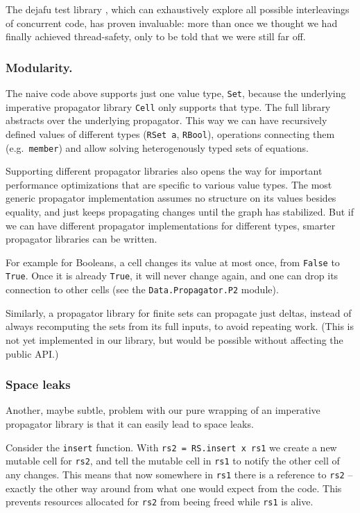 \documentclass[manuscript,anonymous,screen,acmsmall]{acmart}
\begin{document}
The dejafu test library \citep{dejafu}, which can exhaustively explore all possible interleavings of concurrent code, has proven invaluable: more than once we thought we had finally achieved thread-safety, only to be told that we were still far off.

\subsubsection{Modularity.}

The naive code above supports just one value type, \verb|Set|, because the underlying imperative propagator library \verb|Cell| only supports that type. The full library abstracts over the underlying propagator. This way we can have recursively defined values of different types (\verb|RSet a|, \verb|RBool|), operations connecting them (e.g.\ \verb|member|) and allow solving heterogenously typed sets of equations.

Supporting different propagator libraries also opens the way for important performance optimizations that are specific to various value types. The most generic propagator implementation assumes no structure on its values besides equality, and just keeps propagating changes until the graph has stabilized. But if we can have different propagator implementations for different types, smarter propagator libraries can be written.

For example for Booleans, a cell changes its value at most once, from \verb|False| to \verb|True|. Once it is already \verb|True|, it will never change again, and one can drop its connection to other cells (see the \verb|Data.Propagator.P2| module).

Similarly, a propagator library for finite sets can propagate just deltas, instead of always recomputing the sets from its full inputs, to avoid repeating work. (This is not yet implemented in our library, but would be possible without affecting the public API.)

\subsubsection{Space leaks}\label{sec:spaceleak}

Another, maybe subtle, problem with our pure wrapping of an imperative propagator library is that it can easily lead to space leaks.

Consider the \verb|insert| function. With \verb|rs2 = RS.insert x rs1| we create a new mutable cell for \verb|rs2|, and tell the mutable cell in \verb|rs1| to notify the other cell of any changes. This means that now somewhere in \verb|rs1| there is a reference to \verb|rs2| -- exactly the other way around from what one would expect from the code. This prevents resources allocated for \verb|rs2| from beeing freed while \verb|rs1| is alive.
\end{document}
